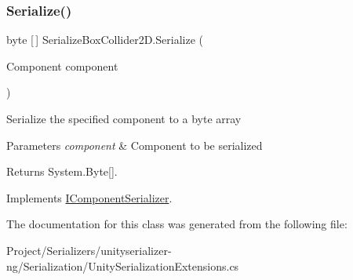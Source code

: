 \subsubsection{\texorpdfstring{Serialize()}{Serialize()}}
{\footnotesize\ttfamily byte \mbox{[}$\,$\mbox{]} Serialize\+Box\+Collider2\+D.\+Serialize (\begin{DoxyParamCaption}\item[{Component}]{component }\end{DoxyParamCaption})\hspace{0.3cm}{\ttfamily [inline]}}



Serialize the specified component to a byte array 


\begin{DoxyParams}{Parameters}
{\em component} & Component to be serialized\\
\hline
\end{DoxyParams}
\begin{DoxyReturn}{Returns}
System.\+Byte\mbox{[}\mbox{]}.
\end{DoxyReturn}


Implements \hyperlink{interface_i_component_serializer_ab2aa38005665496b62d6c54b5f0dbd31}{I\+Component\+Serializer}.



The documentation for this class was generated from the following file\+:\begin{DoxyCompactItemize}
\item 
Project/\+Serializers/unityserializer-\/ng/\+Serialization/Unity\+Serialization\+Extensions.\+cs\end{DoxyCompactItemize}
